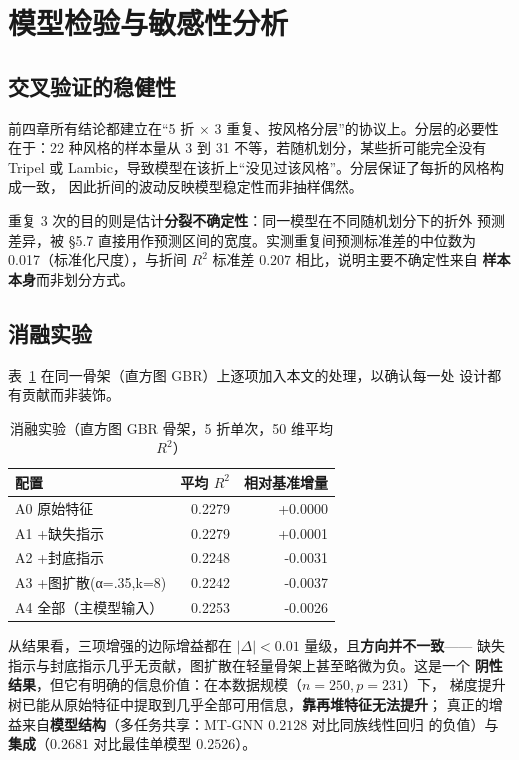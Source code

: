 
\section{模型检验与敏感性分析}

\subsection{交叉验证的稳健性}

前四章所有结论都建立在“5 折 $\times$ 3 重复、按风格分层”的协议上。分层的必要性
在于：22 种风格的样本量从 3 到 31 不等，若随机划分，某些折可能完全没有 Tripel
或 Lambic，导致模型在该折上“没见过该风格”。分层保证了每折的风格构成一致，
因此折间的波动反映模型稳定性而非抽样偶然。

重复 3 次的目的则是估计\textbf{分裂不确定性}：同一模型在不同随机划分下的折外
预测差异，被 \S5.7 直接用作预测区间的宽度。实测重复间预测标准差的中位数为
0.017（标准化尺度），与折间 $R^2$ 标准差 $0.207$ 相比，说明主要不确定性来自
\textbf{样本本身}而非划分方式。

\subsection{消融实验}

表~\ref{tab:ablation} 在同一骨架（直方图 GBR）上逐项加入本文的处理，以确认每一处
设计都有贡献而非装饰。

\begin{table}[H]
\centering
\caption{消融实验（直方图 GBR 骨架，5 折单次，50 维平均 $R^2$）}
\label{tab:ablation}
\small
\begin{fittable}
\begin{tabular}{@{}lrr@{}}
\toprule
配置 & 平均 $R^2$ & 相对基准增量 \\
\midrule
A0 原始特征 & 0.2279 & +0.0000 \\
A1 +缺失指示 & 0.2279 & +0.0001 \\
A2 +封底指示 & 0.2248 & -0.0031 \\
A3 +图扩散(α=.35,k=8) & 0.2242 & -0.0037 \\
A4 全部（主模型输入） & 0.2253 & -0.0026 \\
\bottomrule
\end{tabular}
\end{fittable}
\end{table}

从结果看，三项增强的边际增益都在 $|\Delta|<0.01$ 量级，且\textbf{方向并不一致}——
缺失指示与封底指示几乎无贡献，图扩散在轻量骨架上甚至略微为负。这是一个
\textbf{阴性结果}，但它有明确的信息价值：在本数据规模（$n=250,p=231$）下，
梯度提升树已能从原始特征中提取到几乎全部可用信息，\textbf{靠再堆特征无法提升}；
真正的增益来自\textbf{模型结构}（多任务共享：MT-GNN $0.2128$ 对比同族线性回归
的负值）与\textbf{集成}（$0.2681$ 对比最佳单模型 $0.2526$）。

